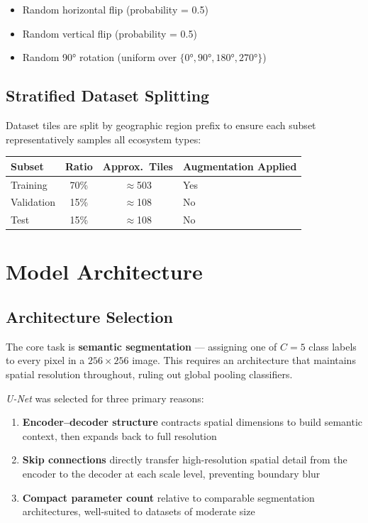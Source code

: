 \documentclass[12pt, a4paper]{article}
\newcommand{\unet}{\textit{U-Net}}
\begin{document}
\begin{itemize}[noitemsep]
  \item Random horizontal flip (probability = 0.5)
  \item Random vertical flip (probability = 0.5)
  \item Random 90° rotation (uniform over $\{0°, 90°, 180°, 270°\}$)
\end{itemize}

\subsection{Stratified Dataset Splitting}

Dataset tiles are split by geographic region prefix to ensure each subset representatively samples all ecosystem types:

\begin{center}
\renewcommand{\arraystretch}{1.2}
\begin{tabular}{lccl}
\toprule
\textbf{Subset} & \textbf{Ratio} & \textbf{Approx.\ Tiles} & \textbf{Augmentation Applied} \\
\midrule
Training   & 70\% & $\approx$503 & Yes \\
Validation & 15\% & $\approx$108 & No  \\
Test       & 15\% & $\approx$108 & No  \\
\bottomrule
\end{tabular}
\end{center}

\section{Model Architecture}

\subsection{Architecture Selection}

The core task is \textbf{semantic segmentation} — assigning one of $C = 5$ class labels to every pixel in a $256 \times 256$ image. This requires an architecture that maintains spatial resolution throughout, ruling out global pooling classifiers.

\unet{} \cite{ronneberger2015} was selected for three primary reasons:

\begin{enumerate}
  \item \textbf{Encoder–decoder structure} contracts spatial dimensions to build semantic context, then expands back to full resolution
  \item \textbf{Skip connections} directly transfer high-resolution spatial detail from the encoder to the decoder at each scale level, preventing boundary blur
  \item \textbf{Compact parameter count} relative to comparable segmentation architectures, well-suited to datasets of moderate size
\end{enumerate}
\end{document}
